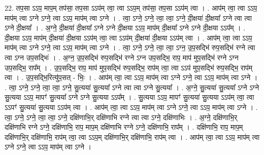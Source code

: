 \documentclass[17pt]{extarticle}
\begin{document}
22. तप॒सा ऽऽप॒ माप॒म् तप॑सा॒ तप॒सा ऽऽप॑म् त्वा॒ त्वा ऽऽप॒म् तप॑सा॒ तप॒सा ऽऽप॑म् त्वा । . आप॑म् त्वा॒ त्वा ऽऽप॒ माप॑म् त्वा ऽग्ने ऽग्ने॒ त्वा ऽऽप॒ माप॑म् त्वा ऽग्ने । . त्वा॒ ऽग्ने॒ ऽग्ने॒ त्वा॒ त्वा॒ ऽग्ने॒ दी॒क्षया॑ दी॒क्षया᳚ ऽग्ने त्वा त्वा ऽग्ने दी॒क्षया᳚ । . अ॒ग्ने॒ दी॒क्षया॑ दी॒क्षया᳚ ऽग्ने ऽग्ने दी॒क्षया ऽऽप॒ माप॑म् दी॒क्षया᳚ ऽग्ने ऽग्ने दी॒क्षया ऽऽप᳚म् । . दी॒क्षया ऽऽप॒ माप॑म् दी॒क्षया॑ दी॒क्षया ऽऽप॑म् त्वा॒ त्वा ऽऽप॑म् दी॒क्षया॑ दी॒क्षया ऽऽप॑म् त्वा । . आप॑म् त्वा॒ त्वा ऽऽप॒ माप॑म् त्वा ऽग्ने ऽग्ने॒ त्वा ऽऽप॒ माप॑म् त्वा ऽग्ने । . त्वा॒ ऽग्ने॒ ऽग्ने॒ त्वा॒ त्वा॒ ऽग्न॒ उ॒प॒सद्भि॑ रुप॒सद्भि॑ रग्ने त्वा त्वा ऽग्न उप॒सद्भिः॑ । . अ॒ग्न॒ उ॒प॒सद्भि॑ रुप॒सद्भि॑ रग्ने ऽग्न उप॒सद्भि॒ राप॒ माप॑ मुप॒सद्भि॑ रग्ने ऽग्न उप॒सद्भि॒ राप᳚म् । . उ॒प॒सद्भि॒ राप॒ माप॑ मुप॒सद्भि॑ रुप॒सद्भि॒ राप॑म् त्वा॒ त्वा ऽऽप॑ मुप॒सद्भि॑ रुप॒सद्भि॒ राप॑म् त्वा । . उ॒प॒सद्भि॒रित्यु॑प॒सत् - भिः॒ । . आप॑म् त्वा॒ त्वा ऽऽप॒ माप॑म् त्वा ऽग्ने ऽग्ने॒ त्वा ऽऽप॒ माप॑म् त्वा ऽग्ने । . त्वा॒ ऽग्ने॒ ऽग्ने॒ त्वा॒ त्वा॒ ऽग्ने॒ सु॒त्यया॑ सु॒त्यया᳚ ऽग्ने त्वा त्वा ऽग्ने सु॒त्यया᳚ । . अ॒ग्ने॒ सु॒त्यया॑ सु॒त्यया᳚ ऽग्ने ऽग्ने सु॒त्यया ऽऽप॒ मापꣳ॑ सु॒त्यया᳚ ऽग्ने ऽग्ने सु॒त्यया ऽऽप᳚म् । . सु॒त्यया ऽऽप॒ मापꣳ॑ सु॒त्यया॑ सु॒त्यया ऽऽप॑म् त्वा॒ त्वा ऽऽपꣳ॑ सु॒त्यया॑ सु॒त्यया ऽऽप॑म् त्वा । . आप॑म् त्वा॒ त्वा ऽऽप॒ माप॑म् त्वा ऽग्ने ऽग्ने॒ त्वा ऽऽप॒ माप॑म् त्वा ऽग्ने । . त्वा॒ ऽग्ने॒ ऽग्ने॒ त्वा॒ त्वा॒ ऽग्ने॒ दक्षि॑णाभि॒र् दक्षि॑णाभि रग्ने त्वा त्वा ऽग्ने॒ दक्षि॑णाभिः । . अ॒ग्ने॒ दक्षि॑णाभि॒र् दक्षि॑णाभि रग्ने ऽग्ने॒ दक्षि॑णाभि॒ राप॒ माप॒म् दक्षि॑णाभि रग्ने ऽग्ने॒ दक्षि॑णाभि॒ राप᳚म् । . दक्षि॑णाभि॒ राप॒ माप॒म् दक्षि॑णाभि॒र् दक्षि॑णाभि॒ राप॑म् त्वा॒ त्वा ऽऽप॒म् दक्षि॑णाभि॒र् दक्षि॑णाभि॒ राप॑म् त्वा । . आप॑म् त्वा॒ त्वा ऽऽप॒ माप॑म् त्वा ऽग्ने ऽग्ने॒ त्वा ऽऽप॒ माप॑म् त्वा ऽग्ने । \newline
\end{document}
